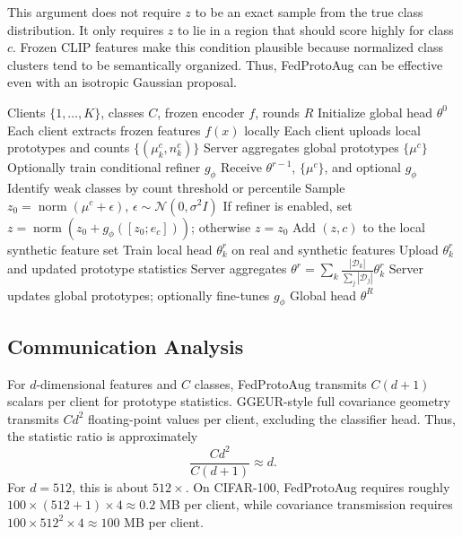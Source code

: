 ﻿\documentclass[runningheads]{llncs}
\newcommand{\method}{FedProtoAug}
\newcommand{\clip}{CLIP}
\begin{document}
This argument does not require $z$ to be an exact sample from the true class distribution. It only requires $z$ to lie in a region that should score highly for class $c$. Frozen \clip{} features make this condition plausible because normalized class clusters tend to be semantically organized. Thus, \method{} can be effective even with an isotropic Gaussian proposal.

\begin{algorithm}[t]
\caption{\method}
\label{alg:fedprotoaug}
\begin{algorithmic}[1]
\Require Clients $\{1,\ldots,K\}$, classes $C$, frozen encoder $f$, rounds $R$
\State Initialize global head $\theta^0$
\State Each client extracts frozen features $f(x)$ locally
\State Each client uploads local prototypes and counts $\{(\mu_k^c,n_k^c)\}$
\State Server aggregates global prototypes $\{\mu^c\}$
\State Optionally train conditional refiner $g_\phi$
        \State Receive $\theta^{r-1}$, $\{\mu^c\}$, and optional $g_\phi$
        \State Identify weak classes by count threshold or percentile
            \State Sample $z_0=\operatorname{norm}(\mu^c+\epsilon)$, $\epsilon\sim\mathcal{N}(0,\sigma^2I)$
            \State If refiner is enabled, set $z=\operatorname{norm}(z_0+g_\phi([z_0;e_c]))$; otherwise $z=z_0$
            \State Add $(z,c)$ to the local synthetic feature set
        \EndFor
        \State Train local head $\theta_k^r$ on real and synthetic features
        \State Upload $\theta_k^r$ and updated prototype statistics
    \EndFor
    \State Server aggregates $\theta^r=\sum_k \frac{|\mathcal{D}_k|}{\sum_j|\mathcal{D}_j|}\theta_k^r$
    \State Server updates global prototypes; optionally fine-tunes $g_\phi$
\EndFor
\State \Return Global head $\theta^R$
\end{algorithmic}
\end{algorithm}

\subsection{Communication Analysis}
For $d$-dimensional features and $C$ classes, \method{} transmits $C(d+1)$ scalars per client for prototype statistics. GGEUR-style full covariance geometry transmits $Cd^2$ floating-point values per client, excluding the classifier head. Thus, the statistic ratio is approximately
\begin{equation}
\frac{Cd^2}{C(d+1)} \approx d.
\end{equation}
For $d=512$, this is about $512\times$. On CIFAR-100, \method{} requires roughly $100\times(512+1)\times4\approx0.2$ MB per client, while covariance transmission requires $100\times512^2\times4\approx100$ MB per client.
\end{document}
